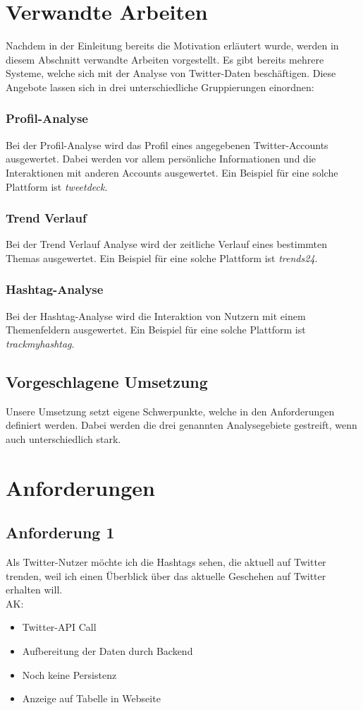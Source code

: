 \documentclass[conference]{IEEEtran}
\begin{document}
\section{Verwandte Arbeiten}
Nachdem in der Einleitung bereits die Motivation erläutert wurde, werden in diesem Abschnitt verwandte Arbeiten vorgestellt.
Es gibt bereits mehrere Systeme, welche sich mit der Analyse von Twitter-Daten beschäftigen.
Diese Angebote lassen sich in drei unterschiedliche Gruppierungen einordnen:
\subsubsection*{Profil-Analyse}
Bei der Profil-Analyse wird das Profil eines angegebenen Twitter-Accounts ausgewertet.
Dabei werden vor allem persönliche Informationen und die Interaktionen mit anderen Accounts ausgewertet.
Ein Beispiel für eine solche Plattform ist \textit{tweetdeck}\cite{tweetdeck}.
\subsubsection*{Trend Verlauf}
Bei der Trend Verlauf Analyse wird der zeitliche Verlauf eines bestimmten Themas ausgewertet. Ein Beispiel für eine solche Plattform ist \textit{trends24}\cite{trends24}.  
\subsubsection*{Hashtag-Analyse}
Bei der Hashtag-Analyse wird die Interaktion von Nutzern mit einem Themenfeldern ausgewertet.
Ein Beispiel für eine solche Plattform ist \textit{trackmyhashtag}\cite{trackmyhashtag}.  
\subsection{Vorgeschlagene Umsetzung}
Unsere Umsetzung setzt eigene Schwerpunkte, welche in den Anforderungen definiert werden.
Dabei werden die drei genannten Analysegebiete gestreift, wenn auch unterschiedlich stark. 
\section{Anforderungen}

\subsection{Anforderung 1}
Als Twitter-Nutzer möchte ich die Hashtags sehen, die aktuell auf Twitter trenden,
weil ich einen Überblick über das aktuelle Geschehen auf Twitter erhalten will.
\\
AK:
\begin{itemize}
        \item Twitter-API Call
        \item Aufbereitung der Daten durch Backend
        \item Noch keine Persistenz
        \item Anzeige auf Tabelle in Webseite
\end{itemize}
\end{document}

